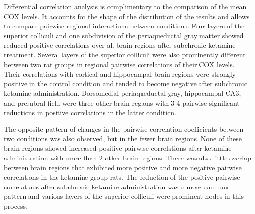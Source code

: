 \documentclass[man]{apa6}
\begin{document}
Differential correlation analysis is complimentary to the comparison of the mean COX levels. It accounts for the shape of the distribution of the results and allows to compare pairwise regional interactions between conditions. Four layers of the superior colliculi and one subdivision of the periaqueductal gray matter showed reduced positive correlations over all brain regions after subchronic ketamine treatment. Several layers of the superior colliculi were also prominently different between two rat groups in regional pairwise correlations of their COX levels. Their correlations with cortical and hippocampal brain regions were strongly positive in the control condition and tended to become negative after subchronic ketamine administration. Dorsomedial periaqueductal gray, hippocampal CA3, and prerubral field were three other brain regions with 3-4 pairwise significant reductions in positive correlations in the latter condition.

The opposite pattern of changes in the pairwise correlation coefficients between two conditions was also observed, but in the fewer brain regions. None of these brain regions showed increased positive pairwise correlations after ketamine administration with more than 2 other brain regions. There was also little overlap between brain regions that exhibited more positive and more negative pairwise correlations in the ketamine group rats. The reduction of the positive pairwise correlations after subchronic ketamine administration was a more common pattern and various layers of the superior colliculi were prominent nodes in this process.
\end{document}
